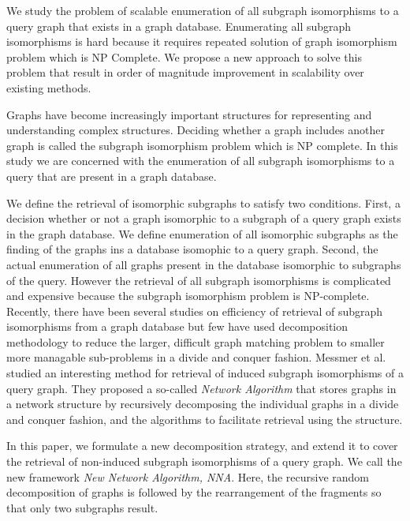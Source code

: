 We study the problem of scalable enumeration of all subgraph isomorphisms to a query graph that exists in a graph database. Enumerating all subgraph isomorphisms is hard because it requires repeated solution of graph isomorphism problem which is NP Complete. We  propose a new  approach to solve this problem that result in order of magnitude improvement in scalability over existing methods. 

Graphs have become increasingly important structures for representing and understanding complex structures. Deciding whether a graph includes another graph is called the subgraph isomorphism problem which is NP complete. In this study we are concerned with the enumeration of all subgraph isomorphisms to a query that are present in a graph database.

We define the retrieval of isomorphic subgraphs to satisfy two conditions.  
First, a decision whether or not a graph isomorphic to a subgraph of a query graph exists in the graph database.
We define enumeration of all isomorphic subgraphs as the finding of the graphs ins a database isomophic to a query graph.
 Second, the actual enumeration of all graphs present in the database isomorphic to subgraphs of the query. However the retrieval of all subgraph isomorphisms is complicated and expensive because the subgraph isomorphism problem is NP-complete.
Recently, there have been several studies on efficiency of retrieval of subgraph isomorphisms from a graph database but few have used decomposition methodology to reduce the larger, difficult graph matching problem to smaller more managable sub-problems in a divide and conquer fashion. Messmer et al. studied an interesting method for retrieval of induced subgraph isomorphisms of a query graph. They proposed a so-called \textit{Network Algorithm} that stores graphs  in a network structure  by recursively decomposing the individual graphs in a divide and conquer fashion, and the algorithms to facilitate retrieval using the structure.

In this paper, we formulate a new decomposition strategy, and extend it to cover the retrieval of non-induced subgraph isomorphisms of a query graph. We call the new framework  \textit{New  Network Algorithm, NNA}. Here, the recursive random decomposition of graphs is followed by the rearrangement of the fragments so that only two subgraphs result.

